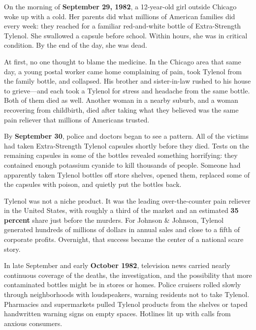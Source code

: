 \documentclass[11pt,openany]{book}
\begin{document}
\begin{corporateexample}
On the morning of \textbf{September 29, 1982}, a 12-year-old girl outside Chicago woke up with a cold. Her parents did what millions of American families did every week: they reached for a familiar red-and-white bottle of Extra-Strength Tylenol. She swallowed a capsule before school. Within hours, she was in critical condition. By the end of the day, she was dead.

At first, no one thought to blame the medicine. In the Chicago area that same day, a young postal worker came home complaining of pain, took Tylenol from the family bottle, and collapsed. His brother and sister-in-law rushed to his house to grieve---and each took a Tylenol for stress and headache from the same bottle. Both of them died as well. Another woman in a nearby suburb, and a woman recovering from childbirth, died after taking what they believed was the same pain reliever that millions of Americans trusted.

By \textbf{September 30}, police and doctors began to see a pattern. All of the victims had taken Extra-Strength Tylenol capsules shortly before they died. Tests on the remaining capsules in some of the bottles revealed something horrifying: they contained enough potassium cyanide to kill thousands of people. Someone had apparently taken Tylenol bottles off store shelves, opened them, replaced some of the capsules with poison, and quietly put the bottles back.

Tylenol was not a niche product. It was the leading over-the-counter pain reliever in the United States, with roughly a third of the market and an estimated \textbf{35 percent} share just before the murders. For Johnson \& Johnson, Tylenol generated hundreds of millions of dollars in annual sales and close to a fifth of corporate profits. Overnight, that success became the center of a national scare story.

In late September and early \textbf{October 1982}, television news carried nearly continuous coverage of the deaths, the investigation, and the possibility that more contaminated bottles might be in stores or homes. Police cruisers rolled slowly through neighborhoods with loudspeakers, warning residents not to take Tylenol. Pharmacies and supermarkets pulled Tylenol products from the shelves or taped handwritten warning signs on empty spaces. Hotlines lit up with calls from anxious consumers.


\end{corporateexample}
\end{document}
